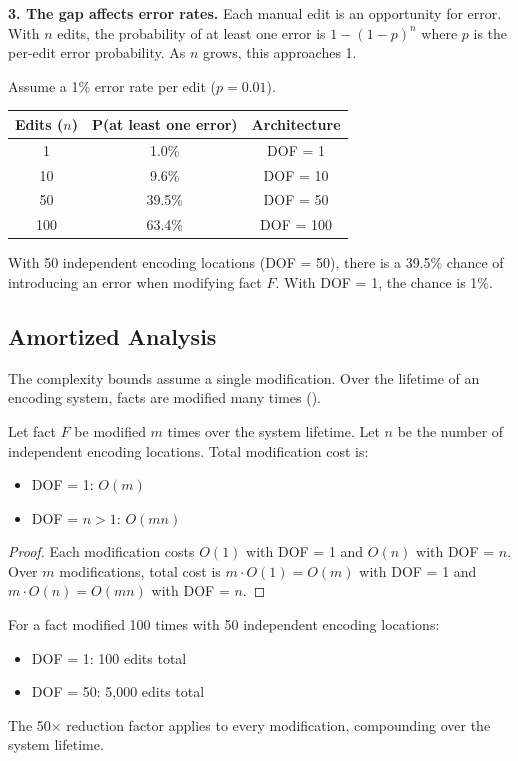 \textbf{3. The gap affects error rates.} Each manual edit is an opportunity for error. With $n$ edits, the probability of at least one error is $1 - (1-p)^n$ where $p$ is the per-edit error probability. As $n$ grows, this approaches 1.

\begin{example}\label{ex:error-rate}
Assume a 1\% error rate per edit ($p = 0.01$).

\begin{center}
\begin{tabular}{ccc}
\toprule
\textbf{Edits ($n$)} & \textbf{P(at least one error)} & \textbf{Architecture} \\
\midrule
1 & 1.0\% & DOF = 1 \\
10 & 9.6\% & DOF = 10 \\
50 & 39.5\% & DOF = 50 \\
100 & 63.4\% & DOF = 100 \\
\bottomrule
\end{tabular}
\end{center}

With 50 independent encoding locations (DOF = 50), there is a 39.5\% chance of introducing an error when modifying fact $F$. With DOF = 1, the chance is 1\%.
\end{example}

\subsection{Amortized Analysis}\label{sec:amortized}

The complexity bounds assume a single modification. Over the lifetime of an encoding system, facts are modified many times ().

\begin{theorem}\label{thm:amortized}
Let fact $F$ be modified $m$ times over the system lifetime. Let $n$ be the number of independent encoding locations. Total modification cost is:
\begin{itemize}
\tightlist
\item DOF = 1: $O(m)$
\item DOF = $n > 1$: $O(mn)$
\end{itemize}
\end{theorem}

\begin{proof}
Each modification costs $O(1)$ with DOF = 1 and $O(n)$ with DOF = $n$. Over $m$ modifications, total cost is $m \cdot O(1) = O(m)$ with DOF = 1 and $m \cdot O(n) = O(mn)$ with DOF = $n$.
\end{proof}

For a fact modified 100 times with 50 independent encoding locations:
\begin{itemize}
\tightlist
\item DOF = 1: 100 edits total
\item DOF = 50: 5,000 edits total
\end{itemize}

The 50$\times$ reduction factor applies to every modification, compounding over the system lifetime.

